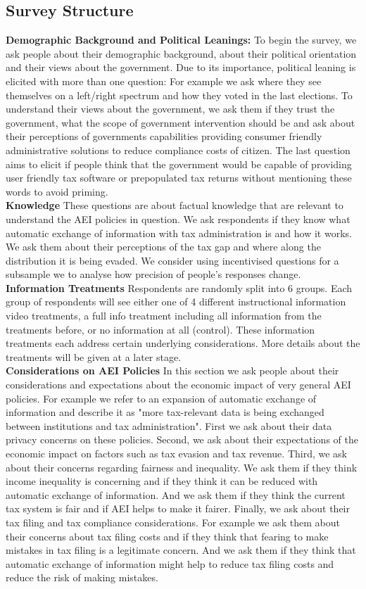 \documentclass[11pt]{article}
\begin{document}
\subsection{Survey Structure} 
\textbf{Demographic Background and Political Leanings:}
To begin the survey, we ask people about their demographic background, about their political orientation and their views about the government. Due to its importance, political leaning is elicited with more than one question: For example we ask where they see themselves on a left/right spectrum and how they voted in the last elections. To understand their views about the government, we ask them if they trust the government, what the scope of government intervention should be and ask about their perceptions of governments capabilities providing consumer friendly administrative solutions to reduce compliance costs of citizen. The last question aims to elicit if people think that the government would be capable of providing user friendly tax software or prepopulated tax returns without mentioning these words to avoid priming. \\[0.5em]
\textbf{Knowledge}
These questions are about factual knowledge that are relevant to understand the AEI policies in question. We ask respondents if they know what automatic exchange of information with tax administration is and how it works. We ask them about their perceptions of the tax gap and where along the distribution it is being evaded. We consider using incentivised questions for a subsample we to analyse how precision of people's responses change.  \\[0.5em]
\textbf{Information Treatments}
Respondents are randomly split into 6 groups. Each group of respondents will see either one of 4 different instructional information video treatments, a full info treatment including all information from the treatments before, or no information at all (control). These information treatments each address certain underlying considerations. More details about the treatments will be given at a later stage.\\[0.5em]
\textbf{Considerations on AEI Policies}
In this section we ask people about their considerations and expectations about the economic impact of very general AEI policies. For example we refer to an expansion of automatic exchange of information and describe it as "more tax-relevant data is being exchanged between institutions and tax administration". First we ask about their data privacy concerns on these policies. Second, we ask about their expectations of the economic impact on factors such as tax evasion and tax revenue. Third, we ask about their concerns regarding fairness and inequality. We ask them if they think income inequality is concerning and if they think it can be reduced with automatic exchange of information. And we ask them if they think the current tax system is fair and if AEI helps to make it fairer. Finally, we ask about their tax filing and tax compliance considerations. For example we ask them about their concerns about tax filing costs and if they think that fearing to make mistakes in tax filing is a legitimate concern.  And we ask them if they think that automatic exchange of information might help to reduce tax filing costs and reduce the risk of making mistakes. \\[0.5em]
\end{document}
